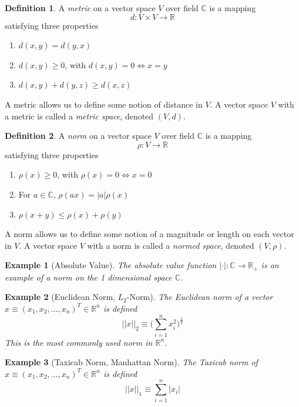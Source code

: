 \documentclass{article}
\newtheorem{example}{Example}[section]
\theoremstyle{remark}
\theoremstyle{definition}
\newtheorem{definition}{Definition}[section]
\begin{document}
  \begin{definition}
  A \textit{metric} on a vector space $V$ over field $\mathbb{C}$ is a mapping
  \[d: V \times V \longrightarrow \mathbb{R} \]
  satisfying three properties 
  \begin{enumerate}
      \item $d(x, y) = d(y, x)$
      \item $d(x, y) \geq 0$, with $d(x,y) = 0 \iff x=y$
      \item $d(x, y) + d(y,z) \geq d(x,z)$
  \end{enumerate}
  A metric allows us to define some notion of distance in $V$. A vector space $V$ with a metric is called a \textit{metric space}, denoted $(V, d)$. 
  \end{definition}

  \begin{definition}
  A \textit{norm} on a vector space $V$ over field $\mathbb{C}$ is a mapping 
  \[\rho: V \longrightarrow \mathbb{R}\]
  satisfying three properties 
  \begin{enumerate}
      \item $\rho (x) \geq 0$, with $\rho(x) = 0 \iff x = 0$
      \item For $a \in \mathbb{C}$, $\rho (a x) = |a| \rho(x)$ 
      \item $\rho(x + y) \leq \rho(x) + \rho(y)$ 
  \end{enumerate}
  A norm allows us to define some notion of a magnitude or length on each vector in $V$. A vector space $V$ with a norm is called a \textit{normed space}, denoted $(V, \rho)$. 
  \end{definition}

  \begin{example}[Absolute Value]
  The absolute value function $|\cdot|: \mathbb{C} \longrightarrow \mathbb{R}_+$ is an example of a norm on the 1 dimensional space $\mathbb{C}$. 
  \end{example}

  \begin{example}[Euclidean Norm, $L_2$-Norm]
  The Euclidean norm of a vector $x \equiv (x_1, x_2, ..., x_n)^T \in \mathbb{R}^n$ is defined
  \[ ||x||_2 \equiv \bigg( \sum_{i=1}^n x_i^2 \bigg)^{\frac{1}{2}}\]
  This is the most commonly used norm in $\mathbb{R}^n$. 
  \end{example}

  \begin{example}[Taxicab Norm, Manhattan Norm]
  The Taxicab norm of $x \equiv (x_1, x_2, ..., x_n)^T \in \mathbb{R}^n$ is defined
  \[ ||x||_1 \equiv \sum_{i=1}^n |x_i|\]
  \end{example}
\end{document}
